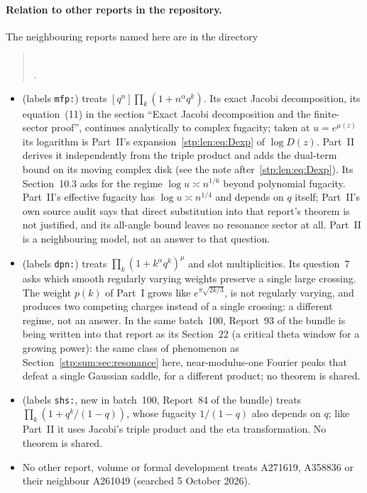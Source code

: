 \documentclass[11pt]{article}
\theoremstyle{remark}\newtheorem{remark}[theorem]{Remark}
\begin{document}
\paragraph{Relation to other reports in the repository.}
The neighbouring reports named here are in the directory
\begin{quote}\small
{}\\
.
\end{quote}
\begin{itemize}
\item {} (labels \texttt{mfp:})
treats $[q^n]\prod_k(1+n^\alpha q^k)$. Its exact Jacobi decomposition, its
equation~(11) in the section ``Exact Jacobi decomposition and the
finite-sector proof'', continues analytically to complex fugacity; taken at
$u=e^{\mu(z)}$ its logarithm is Part~II's
expansion~\eqref{stp:len:eq:Dexp} of $\log D(z)$. Part~II derives
it independently from the triple product and adds the dual-term bound on
its moving complex disk (see the note after~\eqref{stp:len:eq:Dexp}). Its
Section~10.3 asks for the regime $\log u\asymp n^{1/6}$ beyond polynomial
fugacity. Part~II's effective fugacity has $\log u\asymp n^{1/4}$ and depends
on $q$ itself; Part~II's own source audit says that direct substitution into
that report's theorem is not justified, and its all-angle bound leaves no
resonance sector at all. Part~II is a neighbouring model, not an answer to
that question.
\item {} (labels \texttt{dpn:}) treats
$\prod_k(1+k^\alpha q^k)^\mu$ and slot multiplicities. Its question~7 asks
which smooth regularly varying weights preserve a single large crossing.
The weight $p(k)$ of Part~I grows like $e^{\pi\sqrt{2k/3}}$, is not
regularly varying, and produces two competing charges instead of a single
crossing: a different regime, not an answer. In the same batch~100,
Report~93 of the bundle is being written into that report as its
Section~22 (a critical theta window for a growing power): the same class of
phenomenon as Section~\ref{stp:sum:sec:resonance} here, near-modulus-one
Fourier peaks that defeat a single Gaussian saddle, for a different
product; no theorem is shared.
\item {} (labels \texttt{shs:}, new in
batch~100, Report~84 of the bundle) treats $\prod_k(1+q^k/(1-q))$, whose
fugacity $1/(1-q)$ also depends on $q$; like Part~II it uses Jacobi's triple
product and the eta transformation. No theorem is shared.
\item No other report, volume or formal development treats A271619, A358836
or their neighbour A261049 (searched 5 October 2026).
\end{itemize}
\end{document}
